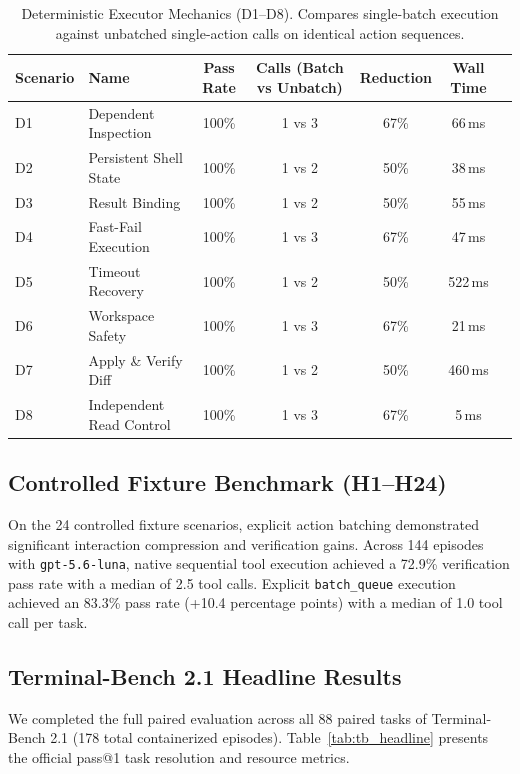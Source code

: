 \documentclass{article}
\begin{document}
\begin{table}[ht]
\centering
\caption{Deterministic Executor Mechanics (D1--D8). Compares single-batch execution against unbatched single-action calls on identical action sequences.}
\label{tab:deterministic}
\small
\begin{tabular}{llccccc}
\toprule
\textbf{Scenario} & \textbf{Name} & \textbf{Pass Rate} & \textbf{Calls (Batch vs Unbatch)} & \textbf{Reduction} & \textbf{Wall Time} \\
\midrule
D1 & Dependent Inspection & 100\% & 1 vs 3 & 67\% & 66\,ms \\
D2 & Persistent Shell State & 100\% & 1 vs 2 & 50\% & 38\,ms \\
D3 & Result Binding & 100\% & 1 vs 2 & 50\% & 55\,ms \\
D4 & Fast-Fail Execution & 100\% & 1 vs 3 & 67\% & 47\,ms \\
D5 & Timeout Recovery & 100\% & 1 vs 2 & 50\% & 522\,ms \\
D6 & Workspace Safety & 100\% & 1 vs 3 & 67\% & 21\,ms \\
D7 & Apply \& Verify Diff & 100\% & 1 vs 2 & 50\% & 460\,ms \\
D8 & Independent Read Control & 100\% & 1 vs 3 & 67\% & 5\,ms \\
\bottomrule
\end{tabular}
\end{table}

\subsection{Controlled Fixture Benchmark (H1--H24)}

On the 24 controlled fixture scenarios, explicit action batching demonstrated significant interaction compression and verification gains. Across 144 episodes with \texttt{gpt-5.6-luna}, native sequential tool execution achieved a 72.9\% verification pass rate with a median of 2.5 tool calls. Explicit \texttt{batch\_queue} execution achieved an 83.3\% pass rate (+10.4 percentage points) with a median of 1.0 tool call per task.

\subsection{Terminal-Bench 2.1 Headline Results}

We completed the full paired evaluation across all 88 paired tasks of Terminal-Bench 2.1 (178 total containerized episodes). Table~\ref{tab:tb_headline} presents the official pass@1 task resolution and resource metrics.
\end{document}
